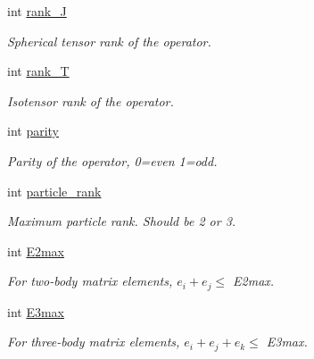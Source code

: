 \begin{DoxyCompactItemize}
\mbox{\label{classOperator_a71a7c194800e2758c42ad0d5f30299aa}} 
int \hyperlink{classOperator_a71a7c194800e2758c42ad0d5f30299aa}{rank\+\_\+J}
\begin{DoxyCompactList}\small\item\em Spherical tensor rank of the operator. \end{DoxyCompactList}\item 
\mbox{\label{classOperator_ac70ee8dbbc4cb4f61972575c68bb9a51}} 
int \hyperlink{classOperator_ac70ee8dbbc4cb4f61972575c68bb9a51}{rank\+\_\+T}
\begin{DoxyCompactList}\small\item\em Isotensor rank of the operator. \end{DoxyCompactList}\item 
\mbox{\label{classOperator_ad628e91e2dd2542c0f34e985271adcd3}} 
int \hyperlink{classOperator_ad628e91e2dd2542c0f34e985271adcd3}{parity}
\begin{DoxyCompactList}\small\item\em Parity of the operator, 0=even 1=odd. \end{DoxyCompactList}\item 
\mbox{\label{classOperator_a44a74c03caff49e776433e885a724956}} 
int \hyperlink{classOperator_a44a74c03caff49e776433e885a724956}{particle\+\_\+rank}
\begin{DoxyCompactList}\small\item\em Maximum particle rank. Should be 2 or 3. \end{DoxyCompactList}\item 
\mbox{\label{classOperator_ace64ea3f299cfba00bc973e58ce03414}} 
int \hyperlink{classOperator_ace64ea3f299cfba00bc973e58ce03414}{E2max}
\begin{DoxyCompactList}\small\item\em For two-\/body matrix elements, $ e_i + e_j \leq $ E2max. \end{DoxyCompactList}\item 
\mbox{\label{classOperator_ad3ebb434f911b9cb7c54ca6990cdda8c}} 
int \hyperlink{classOperator_ad3ebb434f911b9cb7c54ca6990cdda8c}{E3max}
\begin{DoxyCompactList}\small\item\em For three-\/body matrix elements, $ e_i + e_j + e_k \leq $ E3max. \end{DoxyCompactList}\item 

\end{DoxyCompactItemize}
